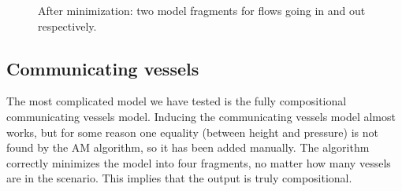 \documentclass{article} %
\begin{document}


\begin{figure}[ht]
\centering
{}
\caption{After minimization: two model fragments for flows going in and out respectively.}
\label{sb_frags}
\end{figure}

\subsection{Communicating vessels} 

The most complicated model we have tested is the fully compositional
communicating vessels model. Inducing the communicating vessels model almost
works, but for some reason one equality (between height and pressure) is not
found by the AM algorithm, so it has been added manually.  The algorithm
correctly minimizes the model into four fragments, no matter how many vessels
are in the scenario. This implies that the output is truly compositional.
\end{document}

